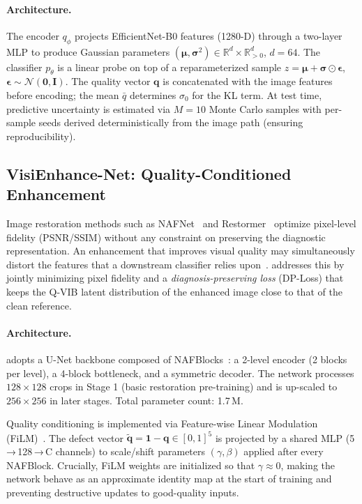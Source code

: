 \paragraph{Architecture.}
The encoder $q_\phi$ projects EfficientNet-B0 features (1280-D) through a two-layer MLP to produce Gaussian parameters $(\boldsymbol{\mu}, \boldsymbol{\sigma}^2) \in \mathbb{R}^{d} \times \mathbb{R}^{d}_{>0}$, $d = 64$.
The classifier $p_\theta$ is a linear probe on top of a reparameterized sample $z = \boldsymbol{\mu} + \boldsymbol{\sigma} \odot \boldsymbol{\epsilon}$, $\boldsymbol{\epsilon} \sim \mathcal{N}(\mathbf{0}, \mathbf{I})$.
The quality vector $\mathbf{q}$ is concatenated with the image features before encoding; the mean $\bar{q}$ determines $\sigma_0$ for the KL term.
At test time, predictive uncertainty is estimated via $M = 10$ Monte Carlo samples with per-sample seeds derived deterministically from the image path (ensuring reproducibility).

\subsection{VisiEnhance-Net: Quality-Conditioned Enhancement}
\label{sec:method:visienhance}


Image restoration methods such as NAFNet~\cite{chen2022simple} and Restormer~\cite{zamir2022restormer} optimize pixel-level fidelity (PSNR/SSIM) without any constraint on preserving the diagnostic representation.
An enhancement that improves visual quality may simultaneously distort the features that a downstream classifier relies upon~\cite{}.
\VisiEnhance{} addresses this by jointly minimizing pixel fidelity and a \emph{diagnosis-preserving loss} (DP-Loss) that keeps the Q-VIB latent distribution of the enhanced image close to that of the clean reference.

\paragraph{Architecture.}
\VisiEnhance{} adopts a U-Net backbone composed of NAFBlocks~\cite{chen2022simple}:
a 2-level encoder (2 blocks per level), a 4-block bottleneck, and a symmetric decoder.
The network processes $128 \times 128$ crops in Stage 1 (basic restoration pre-training) and is up-scaled to $256 \times 256$ in later stages.
Total parameter count: 1.7\,M.

Quality conditioning is implemented via Feature-wise Linear Modulation (FiLM)~\cite{perez2018film}.
The defect vector $\tilde{\mathbf{q}} = \mathbf{1} - \mathbf{q} \in [0,1]^5$ is projected by a shared MLP (5\,→\,128\,→\,C channels) to scale/shift parameters $(\gamma, \beta)$ applied after every NAFBlock.
Crucially, FiLM weights are initialized so that $\gamma \approx 0$, making the network behave as an approximate identity map at the start of training and preventing destructive updates to good-quality inputs.

